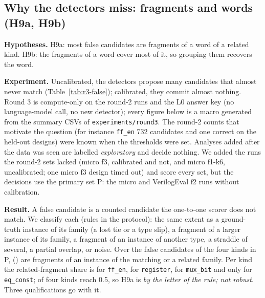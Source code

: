 \documentclass[conference]{IEEEtran}
\newcommand{\hev}[1]{\par\smallskip\noindent\textbf{#1}}
\newcommand{\code}[1]{\texttt{#1}}
\begin{document}
\subsection{Why the detectors miss: fragments and words (H9a, H9b)}
\label{sec:round3}

\hev{Hypotheses.} H9a: most false candidates are fragments of a word of a related kind. H9b: the
fragments of a word cover most of it, so grouping them recovers the word.

\hev{Experiment.} Uncalibrated, the detectors propose many candidates that almost never match
(Table~\ref{tab:r3-false}); calibrated, they commit almost nothing. Round 3 is compute-only on the round-2
runs and the L0 answer key (no language-model call, no new detector); every figure below is a macro
generated from the summary CSVs of \code{experiments/round3}. The round-2 counts that motivate the question
(for instance \code{ff\_en} 732 candidates and one correct on the held-out designs) were known when the
thresholds were set. Analyses added after the data was seen are labelled \emph{exploratory} and decide
nothing. We added the runs the round-2 sets lacked (micro f3, calibrated and not, and micro f1-k6,
uncalibrated; one micro f3 design timed out) and score every set, but the decisions use the primary set P:
the micro and VerilogEval f2 runs without calibration.






\hev{Result.} A false candidate is a counted
candidate the one-to-one scorer does not match. We classify each (rules in the protocol): the
same extent as a ground-truth instance of its family (a lost tie or a type slip), a fragment
of a larger instance of its family, a fragment of an instance of another type, a straddle of
several, a partial overlap, or noise. Over the \rttNinePoolFalse{} false candidates of the four
kinds in P, \rttNinePoolFrag{} (\rttNinePoolFragN) are fragments of an instance of the matching or a
related family. Per kind the related-fragment share is \rttNineFfenFrag{} for \code{ff\_en},
\rttNineRegisterFrag{} for \code{register}, \rttNineMuxbitFrag{} for \code{mux\_bit} and only
\rttNineEqconstFrag{} for \code{eq\_const}; \rttNineKindsOk{} of four kinds reach 0.5, so H9a is
\rttLNineaStatus{} \emph{by the letter of the rule; not robust}. Three qualifications go with it.
\end{document}
